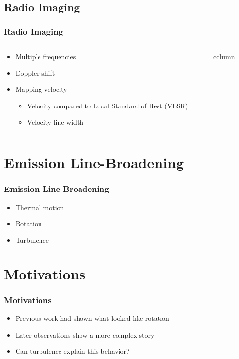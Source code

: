 \documentclass[aspectratio=169,compress]{beamer}
\begin{document}
\subsection{Radio Imaging}
\begin{frame}
  \frametitle{Radio Imaging}
  \begin{columns}
    \begin{column}{0.5\textwidth}
      \begin{itemize}
        \item Multiple frequencies
        \item Doppler shift
        \item Mapping velocity
          \begin{itemize}
            \item Velocity compared to Local Standard of Rest (VLSR)
            \item Velocity line width
          \end{itemize}
      \end{itemize}
    \end{column}
    \begin{column}{0.5\textwidth}
      column
    \end{column}
  \end{columns}
\end{frame}

\section{Emission Line-Broadening}
\begin{frame}
  \frametitle{Emission Line-Broadening}
  \begin{itemize}
    \item Thermal motion
    \item Rotation
    \item Turbulence
  \end{itemize}
\end{frame}

\section{Motivations}
\begin{frame}
  \frametitle{Motivations}
  \begin{itemize}
    \item Previous work had shown what looked like rotation
    \item Later observations show a more complex story
    \item Can turbulence explain this behavior?
  \end{itemize}
\end{frame}
\end{document}
